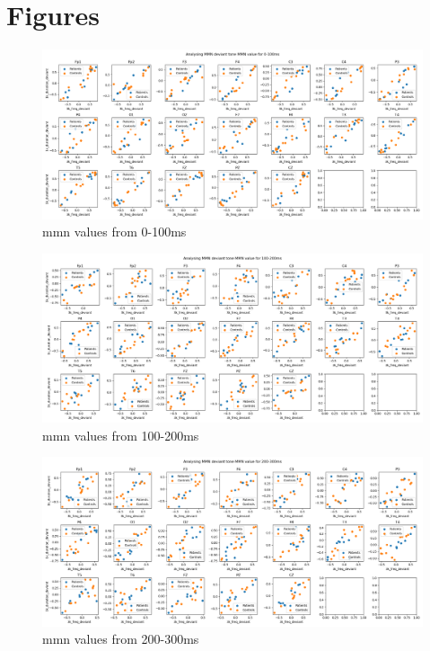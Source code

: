 \documentclass[10pt]{article}
\begin{document}
\section{Figures}\label{figures}
\begin{figure}[H]
  \includegraphics[width=16cm]{../../../data_analysis_results/MMN/features/deviant_tone_0.png}
  \caption{\gls{mmn} values from 0-100ms}\label{mmnvalue_0_100ms}
\end{figure}
\begin{figure}[H]
  \includegraphics[width=16cm]{../../../data_analysis_results/MMN/features/deviant_tone_1.png}
  \caption{\gls{mmn} values from 100-200ms}\label{mmnvalue_100_200ms}
\end{figure}
\begin{figure}[H]
  \includegraphics[width=16cm]{../../../data_analysis_results/MMN/features/deviant_tone_2.png}
  \caption{\gls{mmn} values from 200-300ms}\label{mmnvalue_200_300ms}
\end{figure}
\end{document}
